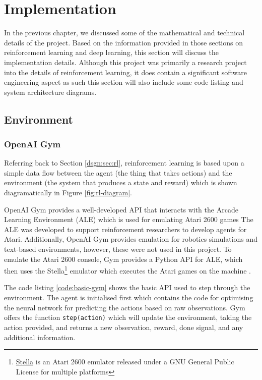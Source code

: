 \chapter{Implementation}
In the previous chapter, we discussed some of the mathematical and technical details of the project. Based on the information provided in those sections on reinforcement learning and deep learning, this section will discuss the implementation details. Although this project was primarily a research project into the details of reinforcement learning, it does contain a significant software engineering aspect as such this section will also include some code listing and system architecture diagrams.

\section{Environment}
\subsection{OpenAI Gym}
Referring back to Section \ref{dsgn:sec:rl}, reinforcement learning is based upon a simple data flow between the agent (the thing that takes actions) and the environment (the system that produces a state and reward) which is shown diagramatically in Figure \ref{fig:rl-diagram}.

OpenAI Gym provides a well-developed API that interacts with the Arcade Learning Environment (ALE) which is used for emulating Atari 2600 games The ALE was developed to support reinforcement researchers to develop agents for Atari\cite{bellemare13arcade}\cite{machado2017revisiting}. Additionally, OpenAI Gym provides emulation for robotics simulations and text-based environments, however, these were not used in this project. To emulate the Atari 2600 console, Gym provides a Python API for ALE, which then uses the Stella\footnote{\href{https://stella-emu.github.io/}{Stella} is an Atari 2600 emulator released under a GNU General Public License for multiple platforms} emulator which executes the Atari games on the machine \cite{brockman2016openai}.

The code listing \ref{code:basic-gym} shows the basic API used to step through the environment. The agent is initialised first which contains the code for optimising the neural network for predicting the actions based on raw observations. Gym offers the function \texttt{step(action)} which will update the environment, taking the action provided, and returns a new observation, reward, done signal, and any additional information.

